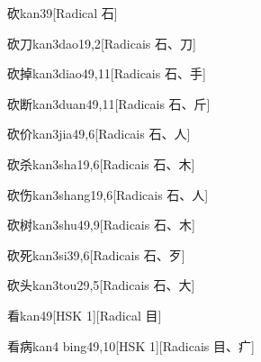 \begin{entry}{砍}{kan3}{9}[Radical ⽯]
\end{entry}

\begin{entry}{砍刀}{kan3dao1}{9,2}[Radicais ⽯、⼑]
\end{entry}

\begin{entry}{砍掉}{kan3diao4}{9,11}[Radicais ⽯、⼿]
\end{entry}

\begin{entry}{砍断}{kan3duan4}{9,11}[Radicais ⽯、⽄]
\end{entry}

\begin{entry}{砍价}{kan3jia4}{9,6}[Radicais ⽯、⼈]
\end{entry}

\begin{entry}{砍杀}{kan3sha1}{9,6}[Radicais ⽯、⽊]
\end{entry}

\begin{entry}{砍伤}{kan3shang1}{9,6}[Radicais ⽯、⼈]
\end{entry}

\begin{entry}{砍树}{kan3shu4}{9,9}[Radicais ⽯、⽊]
\end{entry}

\begin{entry}{砍死}{kan3si3}{9,6}[Radicais ⽯、⽍]
\end{entry}

\begin{entry}{砍头}{kan3tou2}{9,5}[Radicais ⽯、⼤]
\end{entry}

\begin{entry}{看}{kan4}{9}[HSK 1][Radical ⽬]
\end{entry}

\begin{entry}{看病}{kan4 bing4}{9,10}[HSK 1][Radicais ⽬、⽧]
\end{entry}

